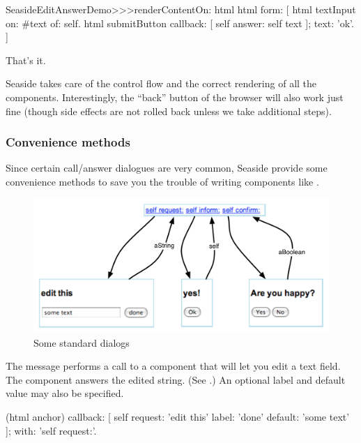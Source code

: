 \documentclass[a4paper,10pt,twoside]{book}
\begin{document}
\begin{code}{}
SeasideEditAnswerDemo>>>renderContentOn: html
	html form: [
		html textInput
			on: #text of: self.
		html submitButton
			callback: [ self answer: self text ];
			text: 'ok'.
		]
\end{code}{}

That's it.

Seaside takes care of the control flow and the correct rendering of all the components.
Interestingly, the ``back'' button of the browser will also work just fine (though side effects are not rolled back unless we take additional steps).

\subsubsection{Convenience methods}

Since certain call/answer dialogues are very common, Seaside provide some convenience methods to save you the trouble of writing components like .

\begin{figure}[ht]
\begin{center}
\includegraphics[width=\textwidth]{dialogs}
\caption{Some standard dialogs}
\label{fig:dialogs}
\end{center}
\end{figure}

The message  performs a call to a component that will let you edit a text field.
The component answers the edited string.
(See .)
An optional label and default value may also be specified.

\begin{code}{}
(html anchor)
	callback: [ self request: 'edit this' label: 'done' default: 'some text' ];
	with: 'self request:'.
\end{code}
\end{document}
